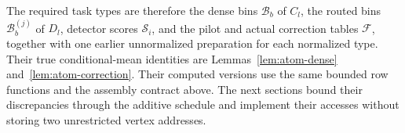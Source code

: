 The required task types are therefore the dense bins $\mathcal B_b$ of
$C_l$, the routed bins $\mathcal B_b^{(j)}$ of $D_l$, detector scores
$\mathcal S_i$, and the pilot and actual correction tables $\mathcal F$,
together with one earlier unnormalized preparation for each normalized
type.  Their true conditional-mean identities are
Lemmas~\ref{lem:atom-dense} and~\ref{lem:atom-correction}.  Their computed
versions use the same bounded row functions and the assembly contract
above.  The next sections bound their discrepancies through the
additive schedule and implement their accesses without storing two
unrestricted vertex addresses.

